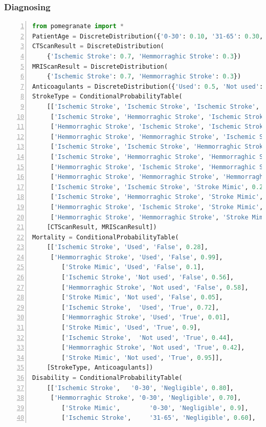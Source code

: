 \documentclass[a4paper, 11pt]{article}
\begin{document}
\subsubsection{Diagnosing}
\begin{lstlisting}[title=diagnosing.py,language=python,numbers=left]
from pomegranate import *
PatientAge = DiscreteDistribution({'0-30': 0.10, '31-65': 0.30, '65+': 0.60})
CTScanResult = DiscreteDistribution(
    {'Ischemic Stroke': 0.7, 'Hemmorraghic Stroke': 0.3})
MRIScanResult = DiscreteDistribution(
    {'Ischemic Stroke': 0.7, 'Hemmorraghic Stroke': 0.3})
Anticoagulants = DiscreteDistribution({'Used': 0.5, 'Not used': 0.5})
StrokeType = ConditionalProbabilityTable(
    [['Ischemic Stroke', 'Ischemic Stroke', 'Ischemic Stroke', 0.8],
     ['Ischemic Stroke', 'Hemmorraghic Stroke', 'Ischemic Stroke', 0.5],
     ['Hemmorraghic Stroke', 'Ischemic Stroke', 'Ischemic Stroke', 0.5],
     ['Hemmorraghic Stroke', 'Hemmorraghic Stroke', 'Ischemic Stroke', 0],
     ['Ischemic Stroke', 'Ischemic Stroke', 'Hemmorraghic Stroke', 0],
     ['Ischemic Stroke', 'Hemmorraghic Stroke', 'Hemmorraghic Stroke', 0.4],
     ['Hemmorraghic Stroke', 'Ischemic Stroke', 'Hemmorraghic Stroke', 0.4],
     ['Hemmorraghic Stroke', 'Hemmorraghic Stroke', 'Hemmorraghic Stroke', 0.9],
     ['Ischemic Stroke', 'Ischemic Stroke', 'Stroke Mimic', 0.2],
     ['Ischemic Stroke', 'Hemmorraghic Stroke', 'Stroke Mimic', 0.1],
     ['Hemmorraghic Stroke', 'Ischemic Stroke', 'Stroke Mimic', 0.1],
     ['Hemmorraghic Stroke', 'Hemmorraghic Stroke', 'Stroke Mimic', 0.1]],
    [CTScanResult, MRIScanResult])
Mortality = ConditionalProbabilityTable(
    [['Ischemic Stroke', 'Used', 'False', 0.28],
     ['Hemmorraghic Stroke', 'Used', 'False', 0.99],
        ['Stroke Mimic', 'Used', 'False', 0.1],
        ['Ischemic Stroke', 'Not used', 'False', 0.56],
        ['Hemmorraghic Stroke', 'Not used', 'False', 0.58],
        ['Stroke Mimic', 'Not used', 'False', 0.05],
        ['Ischemic Stroke',  'Used', 'True', 0.72],
        ['Hemmorraghic Stroke', 'Used', 'True', 0.01],
        ['Stroke Mimic', 'Used', 'True', 0.9],
        ['Ischemic Stroke',  'Not used', 'True', 0.44],
        ['Hemmorraghic Stroke', 'Not used', 'True', 0.42],
        ['Stroke Mimic', 'Not used', 'True', 0.95]],
    [StrokeType, Anticoagulants])
Disability = ConditionalProbabilityTable(
    [['Ischemic Stroke',   '0-30', 'Negligible', 0.80],
     ['Hemmorraghic Stroke', '0-30', 'Negligible', 0.70],
        ['Stroke Mimic',        '0-30', 'Negligible', 0.9],
        ['Ischemic Stroke',     '31-65', 'Negligible', 0.60],

\end{lstlisting}
\end{document}
